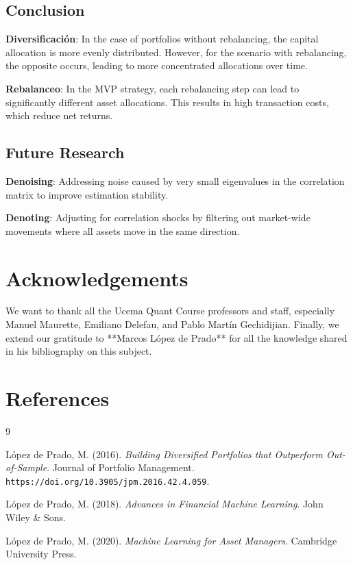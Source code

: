 \documentclass[english]{maciarticle}
\begin{document}
\subsection{Conclusion}

\textbf{Diversificación}: In the case of portfolios without rebalancing, the capital allocation is more evenly distributed. However, for the scenario with rebalancing, the opposite occurs, leading to more concentrated allocations over time.

\textbf{Rebalanceo}: In the MVP strategy, each rebalancing step can lead to significantly different asset allocations. This results in high transaction costs, which reduce net returns.

\subsection{Future Research}

\textbf{Denoising}: Addressing noise caused by very small eigenvalues in the correlation matrix to improve estimation stability.

\textbf{Denoting}: Adjusting for correlation shocks by filtering out market-wide movements where all assets move in the same direction.

\section*{Acknowledgements}

We want to thank all the Ucema Quant Course professors and staff, especially Manuel Maurette, Emiliano Delefau, and Pablo Martín Gechidijian. Finally, we extend our gratitude to **Marcos López de Prado** for all the knowledge shared in his bibliography on this subject.

\section*{References}

\begin{thebibliography}{9}

López de Prado, M. (2016). \textit{Building Diversified Portfolios that Outperform Out-of-Sample}. Journal of Portfolio Management. \texttt{https://doi.org/10.3905/jpm.2016.42.4.059}.

López de Prado, M. (2018). \textit{Advances in Financial Machine Learning}. John Wiley \& Sons.

López de Prado, M. (2020). \textit{Machine Learning for Asset Managers}. Cambridge University Press.

\end{thebibliography}
\end{document}
